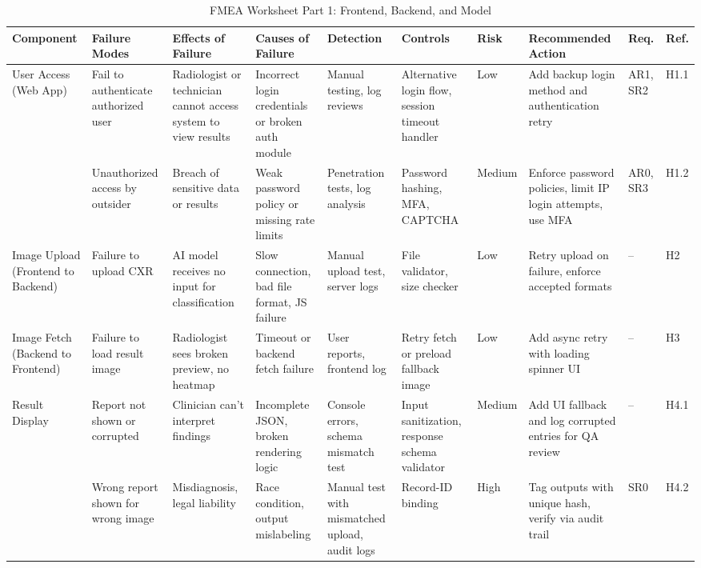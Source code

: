 \documentclass{article}
\begin{document}
\begin{landscape}
\begin{table}[hp]
\caption{FMEA Worksheet Part 1: Frontend, Backend, and Model} \label{FMEA1}
\centering
\begin{footnotesize}
\begin{tabular}{@{}p{1.1in}p{1in}p{1.1in}p{1.5in}p{0.6in}p{0.9in}p{0.3in}p{1.9in}p{0.3in}p{0.4in}@{}}
\toprule
\textbf{Component} & \textbf{Failure Modes} & \textbf{Effects of Failure} & \textbf{Causes of Failure} & \textbf{Detection} & \textbf{Controls} & \textbf{Risk} & \textbf{Recommended Action} & \textbf{Req.} & \textbf{Ref.} \\
\midrule
\multirow{2}{*}{User Access (Web App)} & Fail to authenticate authorized user & Radiologist or technician cannot access system to view results & Incorrect login credentials or broken auth module & Manual testing, log reviews & Alternative login flow, session timeout handler & Low & Add backup login method and authentication retry & AR1, SR2 & H1.1 \\
\cmidrule(lr){2-10}
& Unauthorized access by outsider & Breach of sensitive data or results & Weak password policy or missing rate limits & Penetration tests, log analysis & Password hashing, MFA, CAPTCHA & Medium & Enforce password policies, limit IP login attempts, use MFA & AR0, SR3 & H1.2 \\
\midrule
Image Upload (Frontend to Backend) & Failure to upload CXR & AI model receives no input for classification & Slow connection, bad file format, JS failure & Manual upload test, server logs & File validator, size checker & Low & Retry upload on failure, enforce accepted formats & -- & H2 \\
\midrule
Image Fetch (Backend to Frontend) & Failure to load result image & Radiologist sees broken preview, no heatmap & Timeout or backend fetch failure & User reports, frontend log & Retry fetch or preload fallback image & Low & Add async retry with loading spinner UI & -- & H3 \\
\midrule
\multirow{2}{*}{Result Display} & Report not shown or corrupted & Clinician can't interpret findings & Incomplete JSON, broken rendering logic & Console errors, schema mismatch test & Input sanitization, response schema validator & Medium & Add UI fallback and log corrupted entries for QA review & -- & H4.1 \\
\cmidrule(lr){2-10}
& Wrong report shown for wrong image & Misdiagnosis, legal liability & Race condition, output mislabeling & Manual test with mismatched upload, audit logs & Record-ID binding & High & Tag outputs with unique hash, verify via audit trail & SR0 & H4.2 \\

\end{tabular}
\end{footnotesize}
\end{table}
\end{landscape}
\end{document}
